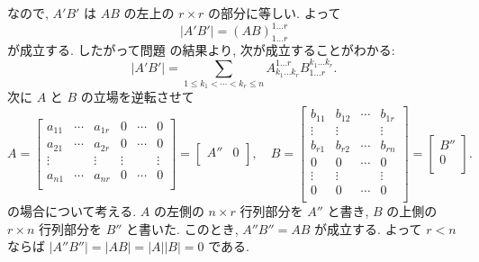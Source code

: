 \documentclass[12pt,twoside]{jarticle}
\begin{document}
\begin{rem}[長方形型の行列の積の行列式]
\begin{equation*}
  \end{equation*}
  なので, $A'B'$ は $AB$ の左上の $r\times r$ の部分に等しい. よって
  \begin{equation*}
    |A'B'| = (AB)^{1\ldots r}_{1\ldots r}
  \end{equation*}
  が成立する.  したがって問題  の結果より,
  次が成立することがわかる:
  \begin{equation*}
    |A'B'| = 
    \sum_{1\le k_1<\cdots<k_r\le n}
    A^{1\ldots r}_{k_1\ldots k_r}
    B^{k_1\ldots k_r}_{1\ldots r}.
  \end{equation*}
  次に $A$ と $B$ の立場を逆転させて
  \begin{equation*}
    A = 
    \begin{bmatrix}
      a_{11} & \cdots & a_{1r} & 0 & \cdots & 0 \\
      a_{21} & \cdots & a_{2r} & 0 & \cdots & 0 \\
      \vdots &        & \vdots & \vdots & & \vdots \\
      a_{n1} & \cdots & a_{nr} & 0 & \cdots & 0 \\
    \end{bmatrix}
    =
    \begin{bmatrix}
      A'' & 0 \\
    \end{bmatrix},
    \quad
    B = 
    \begin{bmatrix}
      b_{11} & b_{12} & \cdots & b_{1r} \\
      \vdots & \vdots &        & \vdots \\
      b_{r1} & b_{r2} & \cdots & b_{rn} \\
      0      & 0      & \cdots & 0 \\
      \vdots & \vdots &        & \vdots \\
      0      & 0      & \cdots & 0 \\
    \end{bmatrix}
    =
    \begin{bmatrix}
      B'' \\
      0 \\
    \end{bmatrix}.
  \end{equation*}
  の場合について考える.
  $A$ の左側の $n\times r$ 行列部分を $A''$ と書き,
  $B$ の上側の $r\times n$ 行列部分を $B''$ と書いた.
  このとき, $A''B'' = AB$ が成立する.
  よって $r<n$ ならば $|A''B''|=|AB|=|A||B|=0$ である.


\end{rem}
\end{document}
